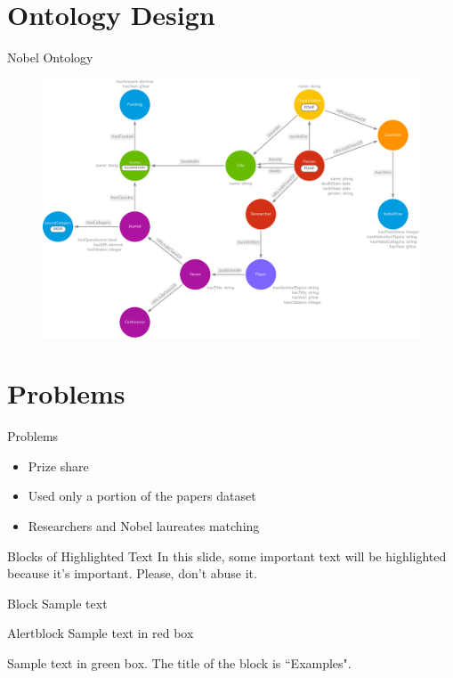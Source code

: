 \documentclass[aspectratio=169,xcolor=dvipsnames]{beamer}
\begin{document}
\section{Ontology Design}

\begin{frame}{Nobel Ontology}
	\begin{figure}
		\includegraphics[width=0.75\linewidth]{../nobelOntologyTransparent.png}
	\end{figure}
\end{frame}

\section{Problems}

\begin{frame}{Problems}
	\begin{itemize}
		\item Prize share
		\item Used only a portion of the papers dataset
		\item Researchers and Nobel laureates matching
	\end{itemize}
\end{frame}


\begin{frame}{Blocks of Highlighted Text}
	In this slide, some important text will be \alert{highlighted} because it's important. Please, don't abuse it.

	\begin{block}{Block}
		Sample text
	\end{block}

	\begin{alertblock}{Alertblock}
		Sample text in red box
	\end{alertblock}

	\begin{examples}
		Sample text in green box. The title of the block is ``Examples".
	\end{examples}
\end{frame}
\end{document}
